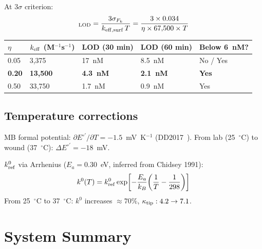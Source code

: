 \documentclass[10pt,a4paper]{article}
\numberwithin{equation}{section}
\newcommand{\CONF}{\textcolor{teal}{\checkmark}}
\begin{document}
At $3\sigma$ criterion:
\begin{equation}
  [\text{MMP-9}]_{\rm LOD} = \frac{3\sigma_{F_k}}{k_{\rm eff,surf}\,T}
  = \frac{3\times0.034}{\eta\times67{,}500\times T}
\end{equation}

\begin{center}\small\renewcommand{\arraystretch}{1.2}
\begin{tabular}{@{}lllll@{}}
\toprule
$\eta$ & $k_{\rm eff}$ (M$^{-1}$s$^{-1}$) & LOD (30 min) & LOD (60 min) & Below 6~nM? \\
\midrule
0.05 & 3{,}375 & 17~nM & 8.5~nM & No / Yes \\
\textbf{0.20} & \textbf{13{,}500} & \textbf{4.3~nM} & \textbf{2.1~nM} & \textbf{Yes} \\
0.50 & 33{,}750 & 1.7~nM & 0.9~nM & Yes \\
\bottomrule
\end{tabular}
\end{center}

\subsection{Temperature corrections}

MB formal potential: $\partial E^{\circ\prime}/\partial T = -1.5$~mV~K$^{-1}$
(DD2017~\CONF). From lab (25~$^\circ$C) to wound (37~$^\circ$C): $\Delta E^{\circ\prime} = -18$~mV.

$k^0_{\rm ref}$ via Arrhenius ($E_a = 0.30$~eV, inferred from Chidsey 1991):
\begin{equation}
  k^0(T) = k^0_{\rm ref}\exp\!\left[-\frac{E_a}{k_B}\!\left(\frac{1}{T}-\frac{1}{298}\right)\right]
\end{equation}
From 25~$^\circ$C to 37~$^\circ$C: $k^0$ increases $\approx70\%$, $\kappa_{\rm tip}:4.2\to7.1$.

\section*{System Summary}
\end{document}
